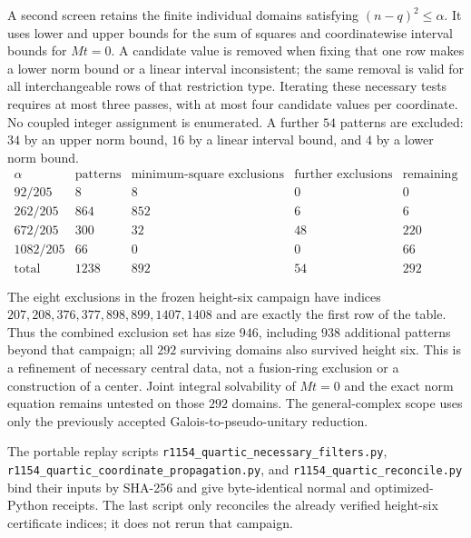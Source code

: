 A second screen retains the finite individual domains satisfying
$(n-q)^2\leq\alpha$. It uses lower and upper bounds for the sum of squares
and coordinatewise interval bounds for $Mt=0$. A candidate value is removed
when fixing that one row makes a lower norm bound or a linear interval
inconsistent; the same removal is valid for all interchangeable rows of that
restriction type. Iterating these necessary tests requires at most three
passes, with at most four candidate values per coordinate. No coupled
integer assignment is enumerated. A further $54$ patterns are excluded:
$34$ by an upper norm bound, $16$ by a linear interval bound, and $4$ by a
lower norm bound.
\[
\begin{array}{c|r|r|r|r}
\alpha&\text{patterns}&\text{minimum-square exclusions}&
\text{further exclusions}&\text{remaining}\\\hline
92/205&8&8&0&0\\
262/205&864&852&6&6\\
672/205&300&32&48&220\\
1082/205&66&0&0&66\\\hline
\text{total}&1238&892&54&292
\end{array}
\]

The eight exclusions in the frozen height-six campaign have indices
$207,208,376,377,898,899,1407,1408$ and are exactly the first row of the table.
Thus the combined exclusion set has size $946$, including $938$ additional
patterns beyond that campaign; all $292$ surviving domains also survived
height six. This is a refinement of necessary central data, not a fusion-ring
exclusion or a construction of a center. Joint integral solvability of
$Mt=0$ and the exact norm equation remains untested on those $292$ domains.
The general-complex scope uses only the previously accepted
Galois-to-pseudo-unitary reduction.

The portable replay scripts \texttt{r1154\_quartic\_necessary\_filters.py},
\texttt{r1154\_quartic\_coordinate\_propagation.py}, and
\texttt{r1154\_quartic\_reconcile.py} bind their inputs by SHA-256 and give
byte-identical normal and optimized-Python receipts. The last script only
reconciles the already verified height-six certificate indices; it does not
rerun that campaign.
